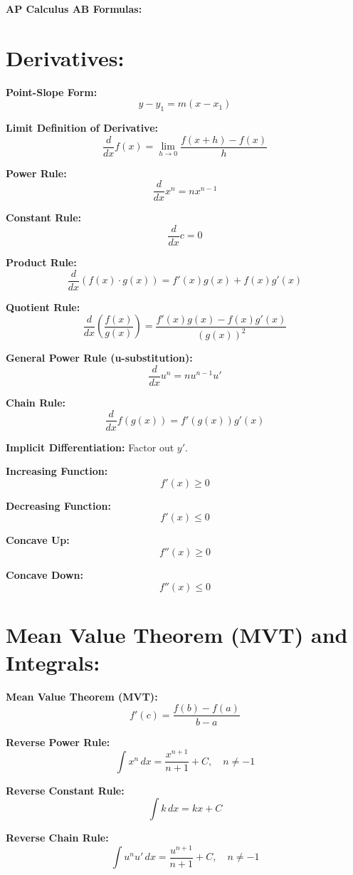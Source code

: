\documentclass{article}
\begin{document}
\begin{center}
    {\fontsize{25}{16}\selectfont \textbf{AP Calculus AB Formulas:}} %
\end{center}

\section*{\textbf{Derivatives:}}

\textbf{Point-Slope Form:}
\[
y - y_1 = m(x - x_1)
\]

\textbf{Limit Definition of Derivative:}
\[
\frac{d}{dx} f(x) = \lim_{h\rightarrow 0} \frac{f(x+h) - f(x)}{h}
\]

\textbf{Power Rule:}
\[
\frac{d}{dx} x^n = n x^{n - 1}
\]

\textbf{Constant Rule:}
\[
\frac{d}{dx} c = 0
\]

\textbf{Product Rule:}
\[
\frac{d}{dx} \left( f(x) \cdot g(x) \right) = f'(x) g(x) + f(x) g'(x)
\]

\textbf{Quotient Rule:}
\[
\frac{d}{dx} \left( \frac{f(x)}{g(x)} \right) = \frac{f'(x) g(x) - f(x) g'(x)}{(g(x))^2}
\]

\textbf{General Power Rule (u-substitution):}
\[
\frac{d}{dx} u^n = n u^{n - 1} u'
\]

\textbf{Chain Rule:}
\[
\frac{d}{dx} f(g(x)) = f'(g(x)) g'(x)
\]

\textbf{Implicit Differentiation:} Factor out \( y' \).

\textbf{Increasing Function:}
\[
f'(x) \geq 0
\]

\textbf{Decreasing Function:}
\[
f'(x) \leq 0
\]

\textbf{Concave Up:}
\[
f''(x) \geq 0
\]

\textbf{Concave Down:}
\[
f''(x) \leq 0
\]

\section*{\textbf{Mean Value Theorem (MVT) and Integrals:}}

\textbf{Mean Value Theorem (MVT):}
\[
f'(c) = \frac{f(b) - f(a)}{b - a}
\]

\textbf{Reverse Power Rule:}
\[
\int x^n \, dx = \frac{x^{n+1}}{n+1} + C, \quad n \neq -1
\]

\textbf{Reverse Constant Rule:}
\[
\int k \, dx = kx + C
\]

\textbf{Reverse Chain Rule:}
\[
\int u^n u' \, dx = \frac{u^{n+1}}{n+1} + C, \quad n \neq -1
\]
\end{document}
